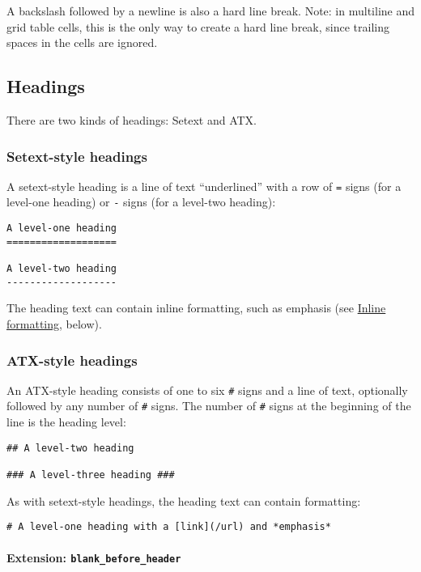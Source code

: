 \documentclass[
]{article}
\begin{document}
A backslash followed by a newline is also a hard line break. Note: in
multiline and grid table cells, this is the only way to create a hard
line break, since trailing spaces in the cells are ignored.

\subsection{Headings}\label{headings}

There are two kinds of headings: Setext and ATX.

\subsubsection{Setext-style headings}\label{setext-style-headings}

A setext-style heading is a line of text ``underlined'' with a row of
\texttt{=} signs (for a level-one heading) or \texttt{-} signs (for a
level-two heading):

\begin{verbatim}
A level-one heading
===================

A level-two heading
-------------------
\end{verbatim}

The heading text can contain inline formatting, such as emphasis (see
\hyperref[inline-formatting]{Inline formatting}, below).

\subsubsection{ATX-style headings}\label{atx-style-headings}

An ATX-style heading consists of one to six \texttt{\#} signs and a line
of text, optionally followed by any number of \texttt{\#} signs. The
number of \texttt{\#} signs at the beginning of the line is the heading
level:

\begin{verbatim}
## A level-two heading

### A level-three heading ###
\end{verbatim}

As with setext-style headings, the heading text can contain formatting:

\begin{verbatim}
# A level-one heading with a [link](/url) and *emphasis*
\end{verbatim}

\paragraph{\texorpdfstring{Extension:
\texttt{blank\_before\_header}}{Extension: blank\_before\_header}}\label{extension-blank_before_header}
\end{document}
